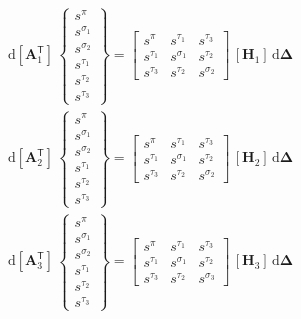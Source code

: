 \begin{equation}
\begin{aligned}
& \mathrm{d} [\mathbf{A}_1^{\mathsf{T}}] \, \begin{Bmatrix} s^{\pi} \\ s^{\sigma_1} \\ s^{\sigma_2} \\ s^{\tau_1} \\ s^{\tau_2} \\ s^{\tau_3}  \end{Bmatrix} = 
\begin{bmatrix}s^{\pi} & s^{\tau_1} & s^{\tau_3}\\ 
s^{\tau_1} & s^{\sigma_1} & s^{\tau_2} \\ 
s^{\tau_3} & s^{\tau_2} & s^{\sigma_2} \end{bmatrix} \, [\mathbf{H}_1] \, \mathrm{d} \boldsymbol{\Delta} \\
& \mathrm{d} [\mathbf{A}_2^{\mathsf{T}}] \, \begin{Bmatrix}s^{\pi} \\ s^{\sigma_1} \\ s^{\sigma_2}  \\ s^{\tau_1} \\ s^{\tau_2} \\ s^{\tau_3}  \end{Bmatrix} = 
\begin{bmatrix} s^{\pi} & s^{\tau_1} & s^{\tau_3}\\ 
s^{\tau_1} & s^{\sigma_1} & s^{\tau_2} \\ 
s^{\tau_3} & s^{\tau_2} & s^{\sigma_2}  \end{bmatrix} \, [\mathbf{H}_2] \, \mathrm{d} \boldsymbol{\Delta}\\
& \mathrm{d} [\mathbf{A}_3^{\mathsf{T}}] \, \begin{Bmatrix}s^{\pi} \\ s^{\sigma_1} \\ s^{\sigma_2}  \\ s^{\tau_1} \\ s^{\tau_2} \\ s^{\tau_3}  \end{Bmatrix} = 
\begin{bmatrix} s^{\pi} & s^{\tau_1} & s^{\tau_3}\\ 
s^{\tau_1} & s^{\sigma_1} & s^{\tau_2} \\ 
s^{\tau_3} & s^{\tau_2} & s^{\sigma_3}  \end{bmatrix} \, [\mathbf{H}_3] \, \mathrm{d} \boldsymbol{\Delta}
\end{aligned}
\end{equation}
